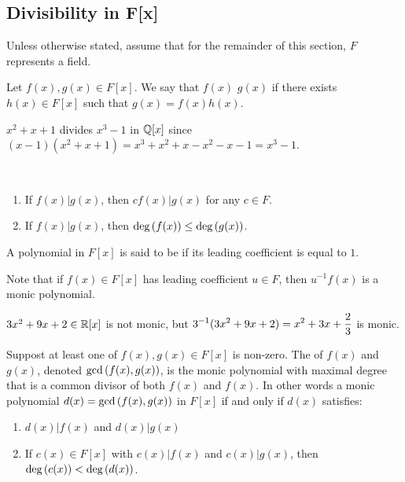 \documentclass[11pt,fleqn,dvipsnames,usenames]{article}
\newcommand{\p}{\noindent}
\begin{document}
\subsection{Divisibility in F[x]}

\p Unless otherwise stated, assume that for the remainder of this section, $F$ represents a field.
%
\begin{definition}
Let $f(x),g(x)\in F[x]$.  We say that $f(x)$  $g(x)$ if there exists $h(x)\in F[x]$ such that $g(x) = f(x)h(x)$.
\end{definition}
%
\begin{example}
$x^2 + x + 1$ divides $x^3 - 1$ in $\mathbb{Q}[x]$ since $(x-1)(x^2 + x + 1) = x^3 + x^2 + x - x^2 - x - 1 = x^3 - 1$.
\end{example}
%
\begin{remarks}~
\begin{enumerate}[(1)]
\item If $f(x)|g(x)$, then $cf(x)|g(x)$ for any $c\in F$.
\item If $f(x)|g(x)$, then $\text{deg}\left(f(x)\right)\leq \text{deg}\left(g(x)\right)$.
\end{enumerate}
\end{remarks}
\vsp

%
\terminology A polynomial in $F[x]$ is said to be  if its leading coefficient is equal to $1$.
\vsp

\p Note that if $f(x)\in F[x]$ has leading coefficient $u\in F$, then $u^{-1}f(x)$ is a monic polynomial.
\vsp

\begin{example}
$3x^2 + 9x + 2\in\mathbb{R}[x]$ is not monic, but $\displaystyle{3^{-1}(3x^2 + 9x + 2) = x^2 + 3x + \frac{2}{3}}$ is monic.
\end{example}
%
\begin{definition}
Suppost at least one of $f(x),g(x)\in F[x]$ is non-zero.  The  of $f(x)$ and $g(x)$, denoted $\text{gcd}\left(f(x),g(x)\right)$, is the monic polynomial with maximal degree that is a common divisor of both $f(x)$ and $f(x)$.  In other words a monic polynomial $d(x) = \text{gcd}\left(f(x),g(x)\right)$ in $F[x]$ if and only if $d(x)$ satisfies:
\begin{enumerate}[(1)]
\item $d(x)|f(x)$ and $d(x)|g(x)$
\item If $c(x) \in F[x]$ with $c(x)|f(x)$ and $c(x)|g(x)$, then $\text{deg}\left(c(x)\right) < \text{deg}\left(d(x)\right)$.
\end{enumerate}
\end{definition}
\vsp
\end{document}

